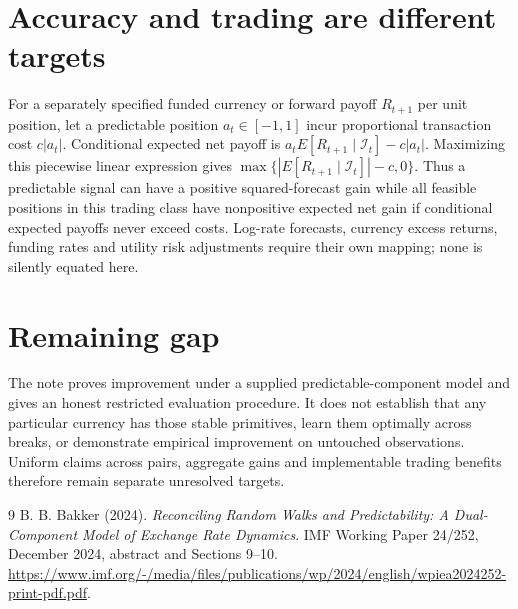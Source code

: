 \documentclass[11pt]{article}
\theoremstyle{remark}
\begin{document}
\section*{Accuracy and trading are different targets}
For a separately specified funded currency or forward payoff $R_{t+1}$ per unit position, let a predictable position $a_t\in[-1,1]$ incur proportional transaction cost $c|a_t|$. Conditional expected net payoff is
$a_tE[R_{t+1}\mid\mathcal I_t]-c|a_t|$. Maximizing this piecewise linear expression gives
$\max\{|E[R_{t+1}\mid\mathcal I_t]|-c,0\}$.
Thus a predictable signal can have a positive squared-forecast gain while all feasible positions in this trading class have nonpositive expected net gain if conditional expected payoffs never exceed costs. Log-rate forecasts, currency excess returns, funding rates and utility risk adjustments require their own mapping; none is silently equated here.

\section*{Remaining gap}
The note proves improvement under a supplied predictable-component model and gives an honest restricted evaluation procedure. It does not establish that any particular currency has those stable primitives, learn them optimally across breaks, or demonstrate empirical improvement on untouched observations. Uniform claims across pairs, aggregate gains and implementable trading benefits therefore remain separate unresolved targets.

\begin{thebibliography}{9}
 B. B. Bakker (2024). \emph{Reconciling Random Walks and Predictability: A Dual-Component Model of Exchange Rate Dynamics}. IMF Working Paper 24/252, December 2024, abstract and Sections 9--10. \url{https://www.imf.org/-/media/files/publications/wp/2024/english/wpiea2024252-print-pdf.pdf}.
\end{thebibliography}
\end{document}
